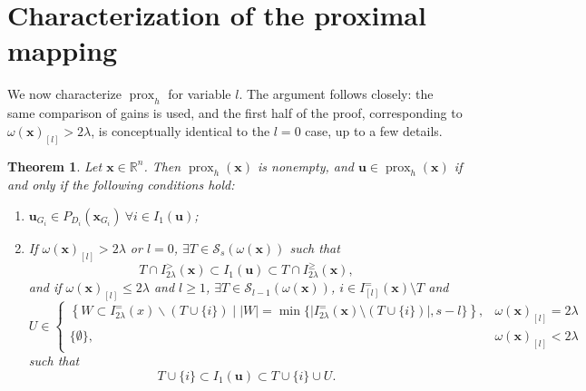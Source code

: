 \documentclass[11pt,a4paper]{article}
\theoremstyle{plain}
\newtheorem{theorem}{Theorem}
\theoremstyle{definition}
\theoremstyle{remark}
\newcommand*\R{\mathbb{R}}
\newcommand*\x{\mathbf{x}}
\newcommand*\U{\mathbf{u}}
\newcommand*\prox{\operatorname{prox}}
\begin{document}
\section{Characterization of the proximal mapping}
\label{sec:prox}

We now characterize \(\prox_{h}\) for variable \(l\).
The argument follows \cite[Theorem~3.2]{beck2018} closely: the same comparison of gains is used, and the first half of the proof, corresponding to \(\omega(\x)_{[l]}> 2\lambda\), is conceptually identical to the \(l=0\) case, up to a few details.

\begin{theorem}\label{thm:proxh}
  Let \(\x \in \R^n\).
  Then \(\prox_h(\x)\) is nonempty, and \(\U \in \prox_h(\x)\)
  if and only if the following conditions hold:
  \begin{enumerate}[label=(\alph*)]
    \item \(\U_{G_i} \in P_{D_i}\left(\x_{G_i}\right)\ \forall i \in I_1(\U)\);
    \item If \(\omega(\x)_{[l]}> 2\lambda\) or \(l=0\), \(\exists T \in \mathcal{S}_{s}(\omega(\x))\) such that
          \begin{equation}
            \label{T1}
            T \cap I_{2\lambda}^>(\x) \subset I_1(\U) \subset T \cap I_{2\lambda}^\geq(\x),
          \end{equation}
          and if \(\omega(\x)_{[l]}\leq 2\lambda\) and \(l\geq 1\), \(\exists T \in \mathcal{S}_{l-1}(\omega(\x))\), \(i\in I^=_{[l]}(\x)\setminus T\) and
          $$
            U\in
            \begin{cases}
              \left\{W \subset I_{2 \lambda}^{=}(x) \backslash(T \cup\{i\})\mid |W| =\min \bigl\{\bigl|I_{2 \lambda}^=(\x)\setminus(T\cup\{i\})\bigr|, s-l\bigr\}\right\}, & \omega(\x)_{[l]}=2\lambda \\
              \{\emptyset\},                                                                                                                                               & \omega(\x)_{[l]}<2\lambda
            \end{cases}
          $$
          such that
          \begin{equation}
            \label{T2}
            T\cup \{i\}\subset I_1(\U)\subset T\cup\{i\}\cup U.
          \end{equation}
  \end{enumerate}
\end{theorem}
\end{document}

